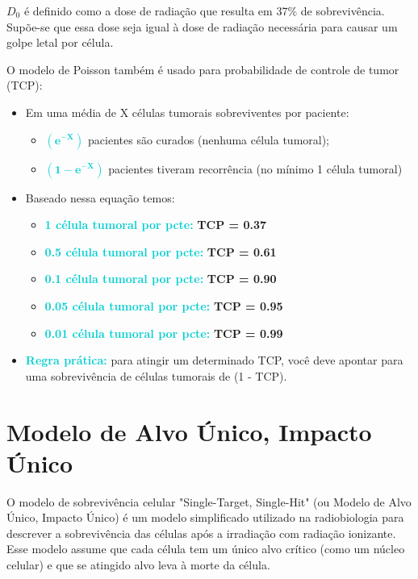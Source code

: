 \documentclass[11pt,a4paper]{article}
\begin{document}
	$D_0$ é definido como a dose de radiação que resulta em 37\% de sobrevivência. Supõe-se que essa dose seja igual à dose de radiação necessária para causar um golpe letal por célula.
	
	O modelo de Poisson também é usado para probabilidade de controle de tumor (TCP):

	\begin{itemize}
		\item Em uma média de X células tumorais sobreviventes por paciente:
		\begin{itemize}[label=\textcolor{CarnationPink}{$\star$}]
			\item \textcolor{DarkTurquoise}{\textbf{$\mathbf{\left(e^{-X}\right)}$}}  pacientes são curados (nenhuma célula tumoral);
			\item \textcolor{DarkTurquoise}{\textbf{$\mathbf{\left(1 - e^{-X}\right)}$}} pacientes tiveram recorrência (no mínimo 1 célula tumoral)
		\end{itemize}

		\item Baseado nessa equação temos:
		\begin{itemize}[label=\textcolor{CarnationPink}{$\star$}]
			\item \textcolor{DarkTurquoise}{\textbf{1 célula tumoral por pcte:}} \textbf{TCP = 0.37}
			\item \textcolor{DarkTurquoise}{\textbf{0.5 célula tumoral por pcte:}} \textbf{TCP = 0.61}
			\item \textcolor{DarkTurquoise}{\textbf{0.1 célula tumoral por pcte:}} \textbf{TCP = 0.90}
			\item \textcolor{DarkTurquoise}{\textbf{0.05 célula tumoral por pcte:}} \textbf{TCP = 0.95}
			\item \textcolor{DarkTurquoise}{\textbf{0.01 célula tumoral por pcte:}} \textbf{TCP = 0.99}
		\end{itemize}
		\item \textcolor{DarkTurquoise}{\textbf{Regra prática:}} para atingir um determinado TCP, você deve apontar para uma sobrevivência de células tumorais de (1 - TCP).
	\end{itemize}


\section{Modelo de Alvo Único, Impacto Único}

	O modelo de sobrevivência celular "Single-Target, Single-Hit" (ou Modelo de Alvo Único, Impacto Único) é um modelo simplificado utilizado na radiobiologia para descrever a sobrevivência das células após a irradiação com radiação ionizante. Esse modelo assume que cada célula tem um único alvo crítico (como um núcleo celular) e que se atingido alvo leva à morte da célula.
\end{document}
